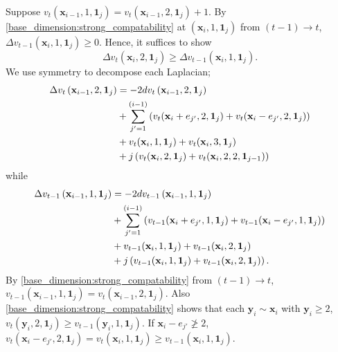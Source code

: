 \documentclass[12pt]{amsart}
\begin{document}
Suppose $v_t(\mathbf{x}_{i-1}, 1, \mathbf{1}_j) = v_{t}(\mathbf{x}_{i-1},2,\mathbf{1}_j) + 1$. 
 By \eqref{base_dimension:strong_compatability} at $(\mathbf{x}_i, 1, \mathbf{1}_j)$ from $(t-1) \to t$, $\Delta v_{t-1}(\mathbf{x}_i, 1, \mathbf{1}_j) \geq 0$. Hence, it suffices to show 
 \[
 \Delta v_{t} \left( \mathbf{x}_i, 2, \mathbf{1}_j \right) \geq  \Delta v_{t-1} \left( \mathbf{x}_{i},1, \mathbf{1}_j \right).
 \]
	We use symmetry to decompose each Laplacian;
 \begin{align}
 \notag \Delta v_{t} \left( \mathbf{x}_{i-1},2, \mathbf{1}_{j} \right) &= -2 d v_{t} \left( \mathbf{x}_{i-1},2, \mathbf{1}_{j} \right) \\
 \label{eq:laplace_11} &+ \sum_{j'=1}^{(i-1)} \left( v_{t}(\mathbf{x}_i + e_{j'}, 2, \mathbf{1}_j) + v_{t}(\mathbf{x}_i - e_{j'}, 2, \mathbf{1}_j) \right) \\
  \label{eq:laplace_12} &+ v_t(\mathbf{x}_i, 1, \mathbf{1}_j) + v_t(\mathbf{x}_i, 3, \mathbf{1}_j) \\
  \label{eq:laplace_13} &+ j \left( v_t(\mathbf{x}_i, 2, \mathbf{1}_j) + v_t(\mathbf{x}_i,2,2,\mathbf{1}_{j-1} ) \right)
 \end{align}
 while 
 \begin{align}
\notag \Delta v_{t-1} \left( \mathbf{x}_{i-1},1, \mathbf{1}_{j} \right) &= -2 d v_{t-1} \left( \mathbf{x}_{i-1},1, \mathbf{1}_{j} \right) \\
 \label{eq:laplace_21} &+ \sum_{j'=1}^{(i-1)} \left( v_{t-1}(\mathbf{x}_i + e_{j'}, 1, \mathbf{1}_j) + v_{t-1}(\mathbf{x}_i - e_{j'}, 1, \mathbf{1}_j) \right) \\
 \label{eq:laplace_22} &+ v_{t-1}(\mathbf{x}_i, 1, \mathbf{1}_j) + v_{t-1}(\mathbf{x}_i, 2, \mathbf{1}_j) \\
 \label{eq:laplace_23} &+ j \left( v_{t-1}(\mathbf{x}_i, 1, \mathbf{1}_j) + v_{t-1}(\mathbf{x}_i,2,\mathbf{1}_j) \right).
 \end{align}
  By \eqref{base_dimension:strong_compatability}  from $(t-1) \to t$, $v_{t-1} \left( \mathbf{x}_{i-1},1, \mathbf{1}_{j} \right) = v_{t} \left( \mathbf{x}_{i-1},2, \mathbf{1}_{j} \right)$. Also \eqref{base_dimension:strong_compatability} shows that  
  each $\mathbf{y}_i \sim \mathbf{x}_i$ with $\mathbf{y}_i \geq 2$, $v_{t}(\mathbf{y}_i,2,\mathbf{1}_j) \geq v_{t-1}(\mathbf{y}_i,1,\mathbf{1}_j)$. If $\mathbf{x}_i - e_{j'} \not \geq 2$, $v_{t}(\mathbf{x}_i - e_{j'}, 2, \mathbf{1}_j) = v_{t}(\mathbf{x}_i, 1, \mathbf{1}_j) \geq v_{t-1}(\mathbf{x}_i, 1, \mathbf{1}_j)$.
\end{document}

